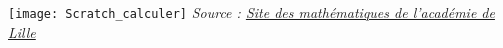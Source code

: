 \Recreation
  
   \texttt{[image: Scratch\_calculer]}
    \vfill\hfill {\it\footnotesize Source : \href{http://joly.vince.free.fr/Manuel_Algo/Scratch_Calculer.pdf}{Site des mathématiques de l'académie de Lille }} 
 

